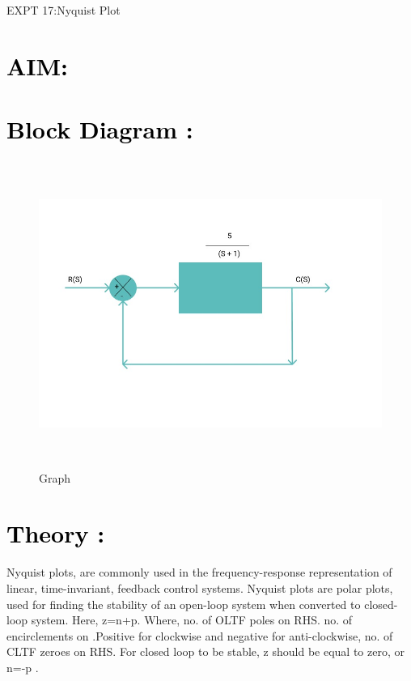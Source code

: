 \documentclass[12pt]{article}
\begin{document}
\pagebreak

\begin{center}
    \LARGE {EXPT 17:Nyquist Plot}
             
\end{center}

\section*{\textcolor{black}{AIM: }}

\section*{\textcolor{black}{Block Diagram :}}

\begin{figure}[!hth]
        \centering
        \includegraphics[width =20cm, height = 10cm]{images/Nyquist block..jpeg}
        \caption{Graph}
        \label{Graph}
\end{figure}

\section*{\textcolor{black}{Theory :}}
Nyquist plots, are commonly used in the frequency-response representation of linear, time-invariant, feedback control systems. Nyquist plots are polar plots, used for finding the stability of an open-loop system when converted to closed-loop system.
Here, z=n+p.
Where, no. of OLTF poles on RHS. no. of encirclements on .Positive for clockwise and negative for anti-clockwise, no. of CLTF zeroes on RHS.
For closed loop to be stable, z should be equal to zero, or n=-p .
\end{document}
